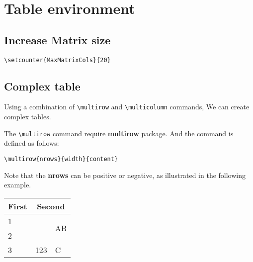 
\chapter{Table environment}
\section{Increase Matrix size}
\begin{lstlisting}[language={[LaTeX]TeX}]
\setcounter{MaxMatrixCols}{20}
\end{lstlisting}

\section{Complex table}
Using a combination of  \lstinline[language={[LaTeX]TeX}]|\multirow| and \lstinline[language={[LaTeX]TeX}]|\multicolumn| commands, We can create complex tables.

The \lstinline[language={[LaTeX]TeX}]|\multirow| command require \textbf{multirow} package. And the command is defined as follows:\\
\begin{lstlisting}[language={[LaTeX]TeX}]
	\multirow{nrows}{width}{content}
 \end{lstlisting}

Note that the \textbf{nrows} can be positive or negative, as illustrated in the following example.

\begin{table}
	\centering
	\begin{tabular}{|l|l|l|}
		\hline
		First & 		 \multicolumn{2}{c|}{Second} 		    \\
		\hline
		1 	  &   		     		  & \multirow{2}{80pt}{AB}  \\ \cline{1-1}
		2 	  &              		  & 						\\ \cline{1-1}	\cline{3-3}
		3 	  & \multirow{-3}{*}{123} & C						\\
		\hline
	\end{tabular}
\end{table}

